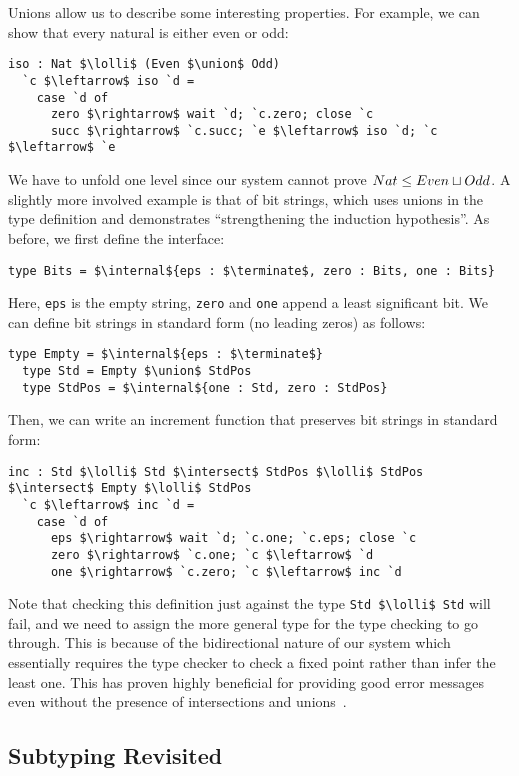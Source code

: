 \documentclass[submission,copyright,creativecommons]{eptcs}
\begin{document}
Unions allow us to describe some interesting properties. For example, we can show that every natural is either even or odd:
\begin{lstlisting}[language=krill, style=custom]
  iso : Nat $\lolli$ (Even $\union$ Odd)
  `c $\leftarrow$ iso `d =
    case `d of
      zero $\rightarrow$ wait `d; `c.zero; close `c
      succ $\rightarrow$ `c.succ; `e $\leftarrow$ iso `d; `c $\leftarrow$ `e
\end{lstlisting}
We have to unfold one level since our system cannot prove $Nat \le Even \mathbin{\sqcup} Odd$. A slightly more involved example is that of bit strings, which uses unions in the type definition and demonstrates ``strengthening the induction hypothesis''. As before, we first define the interface:
\begin{lstlisting}[language=krill, style=custom]
  type Bits = $\internal${eps : $\terminate$, zero : Bits, one : Bits}
\end{lstlisting}
Here, \lstinline{eps} is the empty string, \lstinline{zero} and \lstinline{one} append a least significant bit. We can define bit strings in standard form (no leading zeros) as follows:
\begin{lstlisting}[language=krill, style=custom]
  type Empty = $\internal${eps : $\terminate$}
  type Std = Empty $\union$ StdPos
  type StdPos = $\internal${one : Std, zero : StdPos}
\end{lstlisting}
%
Then, we can write an increment function that preserves bit strings in standard form:
\begin{lstlisting}[language=krill, style=custom]
  inc : Std $\lolli$ Std $\intersect$ StdPos $\lolli$ StdPos $\intersect$ Empty $\lolli$ StdPos
  `c $\leftarrow$ inc `d =
    case `d of
      eps $\rightarrow$ wait `d; `c.one; `c.eps; close `c
      zero $\rightarrow$ `c.one; `c $\leftarrow$ `d
      one $\rightarrow$ `c.zero; `c $\leftarrow$ inc `d
\end{lstlisting}

Note that checking this definition just against the type \lstinline{Std $\lolli$ Std} will fail, and we need to assign the more general type for the type checking to go through. This is because of the bidirectional nature of our system which essentially requires the type checker to check a fixed point rather than infer the least one. This has proven highly beneficial for providing good error messages even without the presence of intersections and unions~\cite{Griffith16phd}.

\subsection{Subtyping Revisited}
\end{document}
